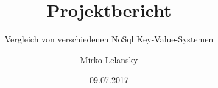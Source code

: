 \documentclass[a4paper, fontsize=11pt]{scrreprt}
\begin{document}
\author{Mirko Lelansky}
\title{Projektbericht}
\subtitle{Vergleich von verschiedenen NoSql Key-Value-Systemen}
\date{09.07.2017}
\maketitle
\clearpage

\clearpage
\tableofcontents
\clearpage





\end{document}
